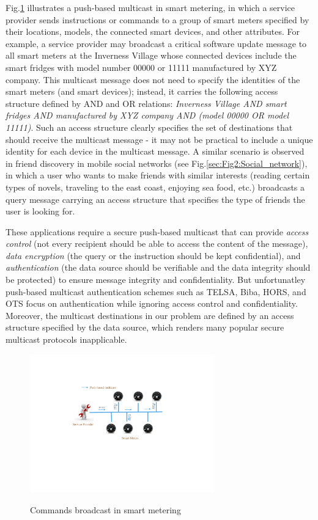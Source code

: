 \documentclass[letterpaper,12pt]{article}
\begin{document}
Fig.\ref{sec:Fig1:Smart_Grid_Architecture} illustrates a push-based multicast in smart metering, in which a service provider sends instructions or commands to a group of smart meters specified by their locations, models, the connected smart devices, and other attributes. For example, a service provider may broadcast a critical software update message to all smart meters at the Inverness Village whose connected devices include the smart fridges with model number 00000 or 11111 manufactured by XYZ company.  This multicast message does not need to specify the identities of the smart meters (and smart devices); instead, it carries the following access structure defined by AND and OR relations: \emph{Inverness Village AND smart fridges AND manufactured by XYZ company AND (model 00000 OR model 11111)}. Such an access structure clearly specifies the set of destinations that should receive the multicast message - it may not be practical to include a unique identity for each device in the multicast message. A similar scenario is observed in friend discovery in mobile social networks (see Fig.\ref{sec:Fig2:Social_network}), in which a user who wants to make friends with similar interests (reading certain types of novels, traveling to the east coast, enjoying sea food, etc.) broadcasts a query message carrying an access structure that specifies the type of friends the user is looking for.


These applications require a secure push-based multicast that can provide \emph{access control} (not every recipient should be able to access the content of the message), \emph{data encryption} (the query or the instruction should be kept confidential), and \emph{authentication} (the data source should be verifiable and the data integrity should be protected) to ensure message integrity and confidentiality. But unfortunatley push-based multicast authentication schemes such as TELSA, Biba, HORS, and OTS \cite{li2011multicast, neumann2004horse, perrig2001biba, reyzin2002better, wang2009time, perrig2005tesla, kgwadi2011securing} focus on authentication while ignoring access control and confidentiality. Moreover, the multicast destinations in our problem are defined by an access structure specified by the data source, which renders many popular secure multicast protocols inapplicable.

\begin{figure}[!htp]
\centering
 \includegraphics[width=8cm]{Smart_Grid_Architecture}\\
 \centering \caption{Commands broadcast  in smart metering}\label{sec:Fig1:Smart_Grid_Architecture}
\end{figure}
\end{document}
